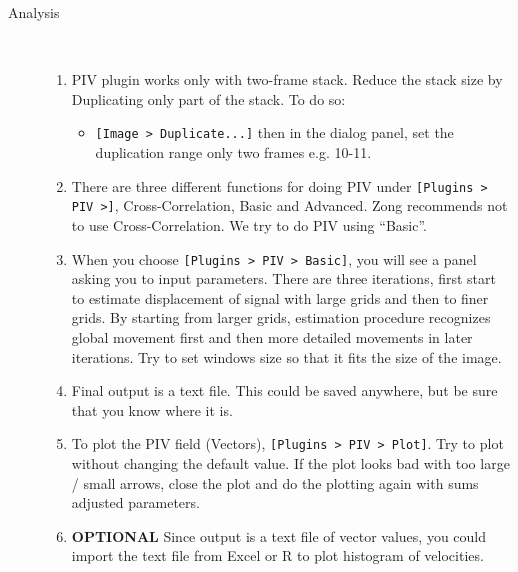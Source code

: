 \documentclass[11pnt]{article}
\begin{document}
\begin{description}
\begin{enumerate}
\end{enumerate}
\item[Analysis]\hfill\\
\begin{enumerate}
\item PIV plugin works only with two-frame stack. Reduce the stack size by Duplicating only part of the stack. To do so:\\
\begin{itemize}
\item \verb"[Image > Duplicate...]" then in the dialog panel, set the duplication range only two frames e.g. 10-11. 
\end{itemize} 
\item There are three different functions for doing PIV under \verb"[Plugins > PIV >]", Cross-Correlation, Basic and Advanced. Zong recommends not to use Cross-Correlation. We try to do PIV using ``Basic''.
\item When you choose \verb"[Plugins > PIV > Basic]", you will see a panel asking you to input parameters. There are three iterations, first start to estimate displacement of signal with large grids and then to finer grids. By starting from larger grids, estimation procedure recognizes global movement first and then more detailed movements in later iterations. Try to set windows size so that it fits the size of the image. 
\item Final output is a text file. This could be saved anywhere, but be sure that you know where it is. 
\item To plot the PIV field (Vectors), \verb"[Plugins > PIV > Plot]". Try to plot without changing the default value. If the plot looks bad with too large / small arrows, close the plot and do the plotting again with sums adjusted parameters.  
\item \textbf{OPTIONAL} Since output is a text file of vector values, you could import the text file from Excel or R to plot histogram of velocities. 
\end{enumerate}



\end{description}
\end{document}
